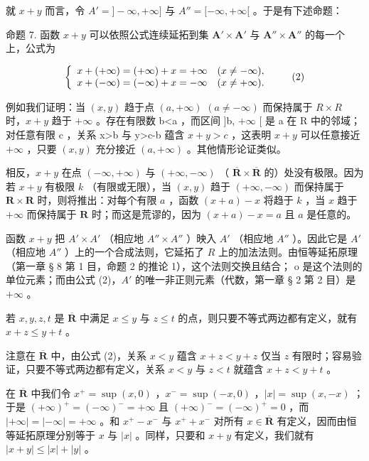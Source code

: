 就 \(x + y\) 而言，令 \(A' = ] - \infty, + \infty]\) 与 \(A'' = [-\infty, + \infty[\) 。于是有下述命题：

命题 7. 函数 \(x + y\) 可以依照公式连续延拓到集 \(\mathbf{A}' \times \mathbf{A}'\) 与 \(\mathbf{A}'' \times \mathbf{A}''\) 的每一个上，公式为

\[
\left\{ \begin{array}{l l} x + (+ \infty) = (+ \infty) + x = + \infty & (x \neq - \infty), \\ x + (- \infty) = (- \infty) + x = - \infty & (x \neq + \infty). \end{array} \right.\tag{2}
\]

例如我们证明：当 \((x,y)\) 趋于点 \((a,+\infty)\) \((a\neq-\infty)\) 而保持属于 \(R\times R\) 时，\(x+y\) 趋于 \(+\infty\) 。存在有限数 b\textless a ，而区间 {]}b, \(+\infty\) {[} 是 a 在 R 中的邻域；对任意有限 c ，关系 x\textgreater b 与 y\textgreater c-b 蕴含 \(x+y>c\) ，这表明 \(x+y\) 可以任意接近 \(+\infty\) ，只要 \((x,y)\) 充分接近 \((a,+\infty)\) 。其他情形论证类似。

相反，\(x + y\) 在点 \((-\infty, +\infty)\) 与 \((+\infty, -\infty)\) （ \(\overline{\mathbf{R}} \times \overline{\mathbf{R}}\) 的）处没有极限。因为若 \(x + y\) 有极限 \(k\) （有限或无限），当 \((x, y)\) 趋于 \((+\infty, -\infty)\) 而保持属于 \(\mathbf{R} \times \mathbf{R}\) 时，则将推出：对每个有限 \(a\) ，函数 \((x + a) - x\) 将趋于 \(k\) ，当 \(x\) 趋于 \(+\infty\) 而保持属于 \(\mathbf{R}\) 时；而这是荒谬的，因为 \((x + a) - x = a\) 且 \(a\) 是任意的。

函数 \(x + y\) 把 \(A' \times A'\) （相应地 \(A'' \times A''\) ）映入 \(A'\) （相应地 \(A''\) ）。因此它是 \(A'\) （相应地 \(A''\) ）上的一个合成法则，它延拓了 \(R\) 上的加法法则。由恒等延拓原理（第一章 § 8 第 1 目，命题 2 的推论 1），这个法则交换且结合； o 是这个法则的单位元素；而由公式 (2)，\(A'\) 的唯一非正则元素（代数，第一章 § 2 第 2 目）是 \(+\infty\) 。

若 \(x, y, z, t\) 是 \(\overline{\mathbf{R}}\) 中满足 \(x \leqslant y\) 与 \(z \leqslant t\) 的点，则只要不等式两边都有定义，就有 \(x + z \leqslant y + t\) 。

注意在 \(\overline{\mathbf{R}}\) 中，由公式 (2)，关系 \(x < y\) 蕴含 \(x + z < y + z\) 仅当 \(z\) 有限时；容易验证，只要不等式两边都有定义，关系 \(x < y\) 与 \(z < t\) 就蕴含 \(x + z < y + t\) 。

在 \(\overline{\mathbf{R}}\) 中我们令 \(x^{+} = \sup (x,0)\) ，\(x^{-} = \sup (-x,0)\) ，\(|x| = \sup (x, - x)\) ；于是 \((+\infty)^{+} = (-\infty)^{-} = +\infty\) 且 \((+\infty)^{-} = (-\infty)^{+} = 0\) ，而 \(|+\infty| = |- \infty| = +\infty\) 。和 \(x^{+} - x^{-}\) 与 \(x^{+} + x^{-}\) 对所有 \(x \in \overline{\mathbf{R}}\) 有定义，因而由恒等延拓原理分别等于 \(x\) 与 \(|x|\) 。同样，只要和 \(x + y\) 有定义，我们就有 \(|x + y| \leqslant |x| + |y|\) 。

